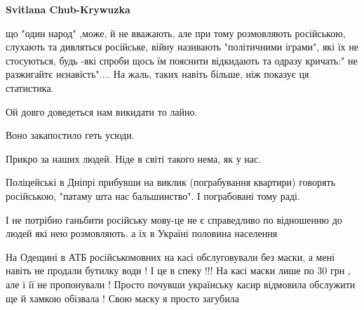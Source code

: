 \begin{itemize}
\begin{itemize}
\textbf{Svitlana Chub-Krywuzka} 

що "один народ" ,може, й не вважають, але при тому розмовляють російською,
слухають та дивляться російське, війну називають "політичними іграми", які їх
не стосуються, будь -які спроби щось їм пояснити відкидають та одразу кричать:"
не разжигайтє нєнавість".... На жаль, таких навіть більше, ніж показує ця
статистика.

\end{itemize}

 
Ой довго доведеться нам викидати то лайно.

Воно закапостило геть усюди.

Прикро за наших людей. Ніде в світі такого нема, як у нас.


 
Поліцейські в Дніпрі прибувши на виклик (пограбування квартири) говорять російською, "патаму шта нас бальшинство". І пограбовані тому раді.

 
І не потрібно ганьбити російську мову-це не є справедливо по відношенню до людей які нею розмовляють. а їх в Україні половина населення

 

На Одещині в АТБ російськомовних на касі обслуговували без маски, а мені навіть
не продали бутилку води ! І це в спеку !!! На касі маски лише по 30 грн , але і
її не пропонували ! Просто почувши українську касир відмовила обслужити ще й
хамкою обізвала ! Свою маску я просто загубила



\end{itemize}

